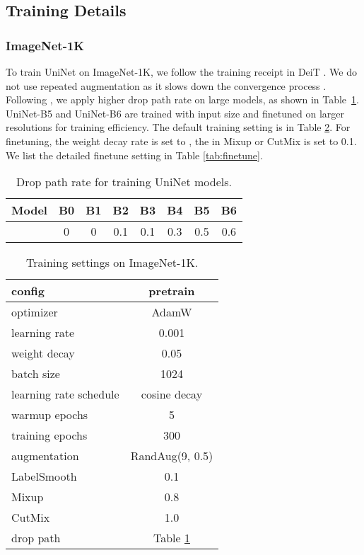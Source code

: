 \documentclass[runningheads]{llncs}
\begin{document}

\subsection{Training Details}

\subsubsection{ImageNet-1K}
To train UniNet on ImageNet-1K, we follow the training receipt in DeiT \cite{deit}. We do not use repeated augmentation \cite{repeated} as it slows down the convergence process \cite{earlyconv}.
Following \cite{cait,effnetv2,coatnet,trainvit}, we apply higher drop path rate  on large models, as shown in Table~\ref{tab:hp}. UniNet-B5 and UniNet-B6 are trained with  input size and finetuned on larger resolutions for training efficiency. The default training setting is in Table \ref{tab:traing_setting}. 
For finetuning, the weight decay rate is set to  \cite{vit}, the  in Mixup \cite{mixup} or CutMix \cite{cutmix} is set to 0.1. We list the detailed finetune setting in Table \ref{tab:finetune}.


\begin{table}[t]
    \centering
\caption{Drop path rate for training UniNet models.}
    \begin{tabular}{c|c|c|c|c|c|c|c}
    \toprule
    Model & B0 & B1 & B2 & B3 & B4 & B5 & B6 \\
    \midrule
     & 0 & 0 & 0.1 & 0.1 & 0.3 & 0.5 & 0.6 \\
    \bottomrule
    \end{tabular}
\label{tab:hp}
\end{table}


\begin{table}[t]
    \centering
    \caption{Training settings on ImageNet-1K.}
    \begin{tabular}{l|c}
        \toprule
        config & pretrain \\
        \midrule
        optimizer & AdamW \cite{adam} \\
        learning rate & 0.001  \\
        weight decay & 0.05  \\
        batch size & 1024  \\
        learning rate schedule & cosine decay \\
        warmup epochs & 5 \\
        training epochs & 300 \\
        augmentation & RandAug(9, 0.5) \cite{randaug} \\
        LabelSmooth \cite{inception} & 0.1 \\
        Mixup \cite{mixup} & 0.8 \\
        CutMix \cite{cutmix} & 1.0 \\
        drop path \cite{droppath} & Table \ref{tab:hp} \\
        \bottomrule
    \end{tabular}
    \label{tab:traing_setting}
\end{table}
\end{document}
